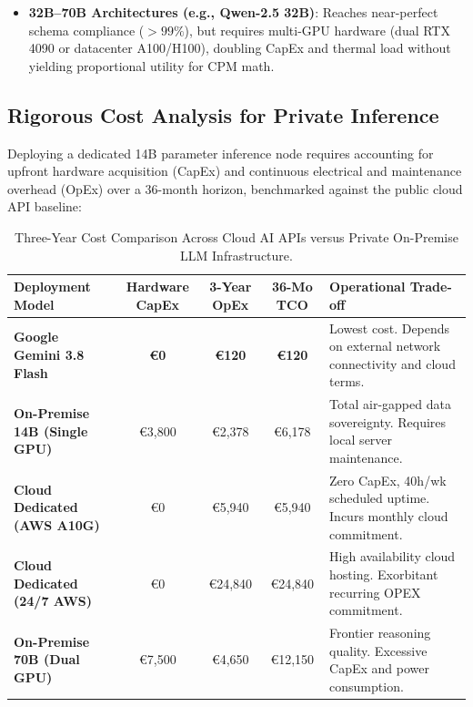 \begin{itemize}[itemsep=1.5pt,topsep=1.5pt]
    \vspace{1mm}
    
    \item \textbf{32B--70B Architectures (e.g., Qwen-2.5 32B)}: Reaches near-perfect schema compliance ($>99\%$), but requires multi-GPU hardware (dual RTX 4090 or datacenter A100/H100), doubling CapEx and thermal load without yielding proportional utility for CPM math.
\end{itemize}

\subsection{Rigorous Cost Analysis for Private Inference}
Deploying a dedicated 14B parameter inference node requires accounting for upfront hardware acquisition (CapEx) and continuous electrical and maintenance overhead (OpEx) over a 36-month horizon, benchmarked against the public cloud API baseline:

\begin{table}[H]
\centering
\scriptsize
\setlength{\tabcolsep}{4pt}
\renewcommand{\arraystretch}{1.18}
\caption*{Three-Year Cost Comparison Across Cloud AI APIs versus Private On-Premise LLM Infrastructure.}
\begin{tabularx}{\textwidth}{>{\raggedright\arraybackslash}p{3.2cm} c c c >{\raggedright\arraybackslash}X}
\toprule
\textbf{Deployment Model} & \textbf{Hardware CapEx} & \textbf{3-Year OpEx} & \textbf{36-Mo TCO} & \textbf{Operational Trade-off} \\
\midrule
\textbf{Google Gemini 3.8 Flash} & \textbf{€0} & \textbf{€120} & \textbf{€120} & Lowest cost. Depends on external network connectivity and cloud terms. \\
\textbf{On-Premise 14B (Single GPU)} & €3,800 & €2,378 & €6,178 & Total air-gapped data sovereignty. Requires local server maintenance. \\
\textbf{Cloud Dedicated (AWS A10G)} & €0 & €5,940 & €5,940 & Zero CapEx, 40h/wk scheduled uptime. Incurs monthly cloud commitment. \\
\textbf{Cloud Dedicated (24/7 AWS)} & €0 & €24,840 & €24,840 & High availability cloud hosting. Exorbitant recurring OPEX commitment. \\
\textbf{On-Premise 70B (Dual GPU)} & €7,500 & €4,650 & €12,150 & Frontier reasoning quality. Excessive CapEx and power consumption. \\
\bottomrule
\end{tabularx}
\end{table}


